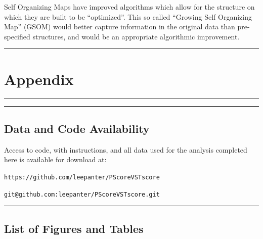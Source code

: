 \documentclass[12pt,]{article}
\begin{document}
Self Organizing Maps have improved algorithms which allow for the
structure on which they are built to be ``optimized''. This so called
``Growing Self Organizing Map'' (GSOM) would better capture information
in the original data than pre-specified structures, and would be an
appropriate algorithmic improvement.

\begin{center}\rule{0.5\linewidth}{\linethickness}\end{center}

\hypertarget{appendix}{%
\section{Appendix}\label{appendix}}

\begin{center}\rule{0.5\linewidth}{\linethickness}\end{center}

\newpage

\begin{center}\rule{0.5\linewidth}{\linethickness}\end{center}

\hypertarget{data-and-code-availability}{%
\subsection{Data and Code
Availability}\label{data-and-code-availability}}

\thispagestyle{empty}

Access to code, with instructions, and all data used for the analysis
completed here is available for download at:

\texttt{https://github.com/leepanter/PScoreVSTscore}

\texttt{git@github.com:leepanter/PScoreVSTscore.git}

\newpage

\begin{center}\rule{0.5\linewidth}{\linethickness}\end{center}

\hypertarget{list-of-figures-and-tables}{%
\subsection{List of Figures and
Tables}\label{list-of-figures-and-tables}}

\thispagestyle{empty}

\listoffigures
\end{document}
